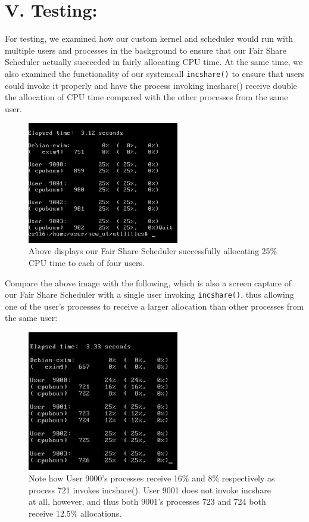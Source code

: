 \documentclass[10pt]{article}
\begin{document}
\section{V. Testing:}

For testing, we examined how our custom kernel and scheduler would run with multiple users and processes in the background to ensure that our Fair Share Scheduler actually succeeded in fairly allocating CPU time. At the same time, we also examined the functionality of our systemcall \texttt{incshare()} to ensure that users could invoke it properly and have the process invoking incshare() receive double the allocation of CPU time compared with the other processes from the same user. 

\begin{figure}[H]
 \caption{Above displays our Fair Share Scheduler successfully allocating 25\% CPU time to each of four users.}
 \centering
 \includegraphics[width=250px]{fairshare.jpg}
\end{figure}

Compare the above image with the following, which is also a screen capture of our Fair Share Scheduler with a single user invoking \texttt{incshare()}, thus 
allowing one of the user's processes to receive a larger allocation than
other processes from the same user:

\begin{figure}[H]
 \caption{Note how User 9000's processes receive 16\% and 8\% respectively as process 721 invokes incshare(). User 9001 does not invoke incshare at all, however, and thus both 9001's processes 723 and 724 both receive 12.5\% allocations.}
 \centering
 \includegraphics[width=250px]{incsharemonitor.jpg}
\end{figure}
\end{document}
